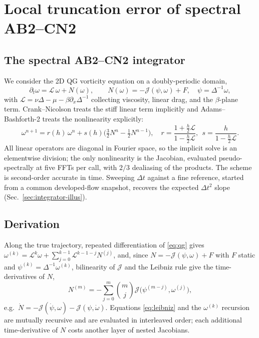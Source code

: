 \documentclass[11pt]{article}
\theoremstyle{plain}
\theoremstyle{definition}
\newcommand{\Lop}{\mathcal{L}}
\newcommand{\Jop}{\mathcal{J}}
\newcommand{\Ndot}{\dot{N}}
\begin{document}
\section{Local truncation error of spectral AB2--CN2}
\label{sec:lte}

\subsection{The spectral AB2--CN2 integrator}
\label{sec:integrator}
We consider the 2D QG vorticity equation on a doubly-periodic domain,
\begin{equation}
\partial_t\omega = \Lop\,\omega + N(\omega),\qquad
N(\omega)=-\Jop(\psi,\omega)+F,\quad \psi=\Delta^{-1}\omega,
\label{eq:qg}
\end{equation}
with $\Lop=\nu\Delta-\mu-\beta\partial_x\Delta^{-1}$ collecting viscosity,
linear drag, and the $\beta$-plane term. Crank--Nicolson treats the stiff
linear term implicitly and Adams--Bashforth-2 treats the nonlinearity
explicitly:
\begin{equation}
\omega^{n+1}=r(h)\,\omega^n+s(h)\Big(\tfrac32 N^n-\tfrac12 N^{n-1}\Big),\quad
r=\frac{1+\tfrac h2\Lop}{1-\tfrac h2\Lop},\ \ s=\frac{h}{1-\tfrac h2\Lop}.
\label{eq:ab2cn2}
\end{equation}
All linear operators are diagonal in Fourier space, so the implicit solve is an
elementwise division; the only nonlinearity is the Jacobian, evaluated
pseudo-spectrally at five FFTs per call, with $2/3$ dealiasing of the products.
The scheme is second-order accurate in time. Sweeping $\Delta t$ against a fine
reference, started from a common developed-flow snapshot, recovers the expected
$\Delta t^2$ slope (Sec.~\ref{sec:integrator-illus}).

\subsection{Derivation}
\label{sec:lte-derivation}
Along the true trajectory, repeated differentiation of \eqref{eq:qg} gives
$\omega^{(k)}=\Lop^k\omega+\sum_{j=0}^{k-1}\Lop^{k-1-j}N^{(j)}$, and, since
$N=-\Jop(\psi,\omega)+F$ with $F$ static and $\psi^{(k)}=\Delta^{-1}
\omega^{(k)}$, bilinearity of $\Jop$ and the Leibniz rule give the
time-derivatives of $N$,
\begin{equation}
N^{(m)}=-\sum_{j=0}^m\binom{m}{j}\Jop\!\big(\psi^{(m-j)},\omega^{(j)}\big),
\label{eq:leibniz}
\end{equation}
e.g.\ $\Ndot=-\Jop(\dot\psi,\omega)-\Jop(\psi,\dot\omega)$. Equations
\eqref{eq:leibniz} and the $\omega^{(k)}$ recursion are mutually recursive and
are evaluated in interleaved order; each additional time-derivative of $N$
costs another layer of nested Jacobians.
\end{document}

